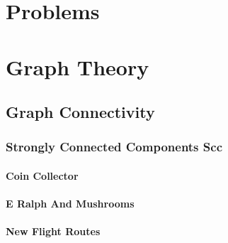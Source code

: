 
\appendix
\section{Problems}
\section{Graph Theory}
\subsection{Graph Connectivity}
\subsubsection{Strongly Connected Components Scc}
\paragraph{Coin Collector}


\paragraph{E Ralph And Mushrooms}


\paragraph{New Flight Routes}


